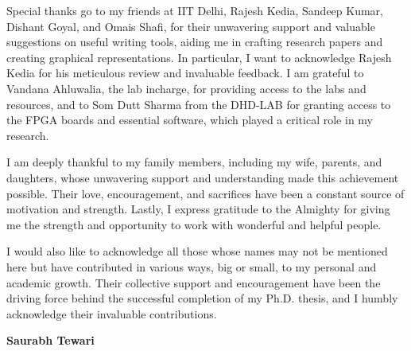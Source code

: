 Special thanks go to my friends at IIT Delhi, Rajesh Kedia, Sandeep Kumar, Dishant Goyal, and Omais Shafi, for their unwavering support and valuable suggestions on useful writing tools, aiding me in crafting research papers and creating graphical representations. In particular, I want to acknowledge Rajesh Kedia for his meticulous review and invaluable feedback. I am grateful to Vandana Ahluwalia, the lab incharge, for providing access to the labs and resources, and to Som Dutt Sharma from the DHD-LAB for granting access to the FPGA boards and essential software, which played a critical role in my research.

I am deeply thankful to my family members, including my wife, parents, and daughters, whose unwavering support and understanding made this achievement possible. Their love, encouragement, and sacrifices have been a constant source of motivation and strength. Lastly, I express gratitude to the Almighty for giving me the strength and opportunity to work with wonderful and helpful people.

I would also like to acknowledge all those whose names may not be mentioned here but have contributed in various ways, big or small, to my personal and academic growth. Their collective support and encouragement have been the driving force behind the successful completion of my Ph.D. thesis, and I humbly acknowledge their invaluable contributions.
\vspace{0.9cm}
{ \begin{flushright}{\bf Saurabh Tewari}\end{flushright} }
